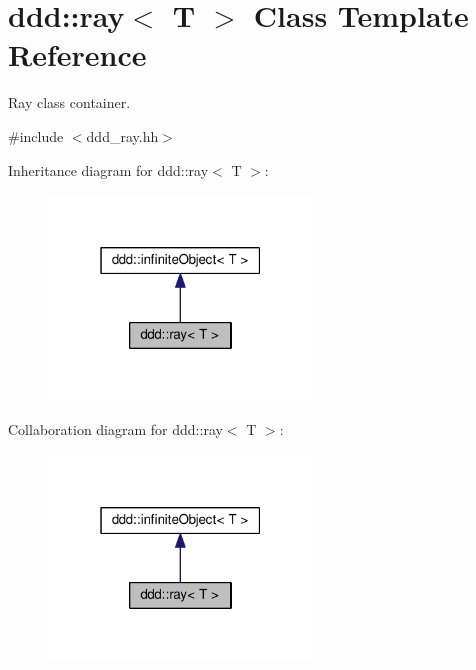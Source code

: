 \hypertarget{classddd_1_1ray}{}\section{ddd\+:\+:ray$<$ T $>$ Class Template Reference}
\label{classddd_1_1ray}


Ray class container.  




{\ttfamily \#include $<$ddd\+\_\+ray.\+hh$>$}



Inheritance diagram for ddd\+:\+:ray$<$ T $>$\+:\nopagebreak
\begin{figure}[H]
\begin{center}
\leavevmode
\includegraphics[width=199pt]{d6/d54/classddd_1_1ray__inherit__graph}
\end{center}
\end{figure}


Collaboration diagram for ddd\+:\+:ray$<$ T $>$\+:\nopagebreak
\begin{figure}[H]
\begin{center}
\leavevmode
\includegraphics[width=199pt]{d0/d0e/classddd_1_1ray__coll__graph}
\end{center}
\end{figure}
